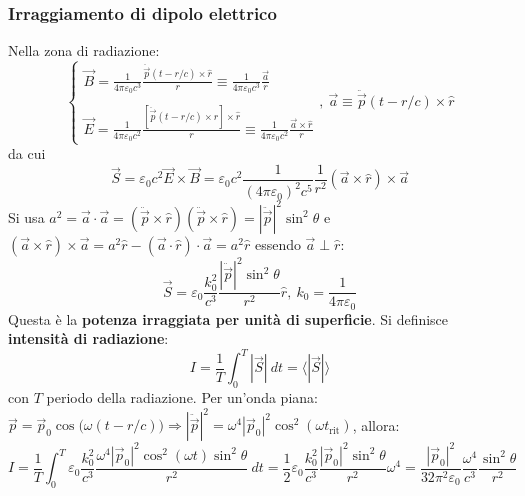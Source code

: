 \documentclass[a4paper]{scrartcl}
\numberwithin{equation}{subsection}
\theoremstyle{style1}
\begin{document}
\subsubsection{Irraggiamento di dipolo elettrico}\label{ide}

Nella zona di radiazione:
\[
\begin{cases}
	\displaystyle \vec{B} = \frac{1}{4\pi \varepsilon _0 c^3}\frac{\ddot{\vec{p}}(t - r /c)\times \hat{r}}{r}\equiv \frac{1}{4\pi \varepsilon _0 c^3}\frac{\vec{a}}{r}\\
	\\
	\displaystyle \vec{E}= \frac{1}{4\pi \varepsilon _0 c^2} \frac{\left[ \ddot{\vec{p}}(t- r / c) \times \hat{r} \right] \times \hat{r}}{r}\equiv \frac{1}{4\pi \varepsilon _0 c^2} \frac{\vec{a}\times \hat{r}}{r}
\end{cases}, \ \vec{a}\equiv \ddot{\vec{p}}(t - r /c) \times \hat{r}
\] 
da cui
\begin{equation*}
	\vec{S}=\varepsilon _0 c^2 \vec{E}\times \vec{B}=\varepsilon _0 c^2 \frac{1}{(4 \pi \varepsilon _0)^2 c^5} \frac{1}{r^2} (\vec{a}\times \hat{r}) \times \vec{a}
\end{equation*}
Si usa $a^2 = \vec{a}\cdot \vec{a}=(\ddot{\vec{p}}\times \hat{r}) (\ddot{\vec{p}}\times \hat{r}) = |\ddot{\vec{p}}|^2 \sin^2 \theta $ e $(\vec{a}\times \hat{r})\times \vec{a}= a^2 \hat{r}- (\vec{a}\cdot \hat{r}) \cdot \vec{a}= a^2 \hat{r}$ essendo $\vec{a}\perp \hat{r}$:
\begin{equation}
	\vec{S}= \varepsilon _0 \frac{k_0^2}{c^3} \frac{|\ddot{\vec{p}}|^2 \sin^2 \theta }{r^2} \hat{r}, \ k_0 = \frac{1}{4\pi \varepsilon _0}
\end{equation}
Questa \`e la \textbf{potenza irraggiata per unit\`a di superficie}. Si definisce \textbf{intensit\`a di radiazione}:
\begin{equation}
	I = \frac{1}{T} \int_{0} ^T |\vec{S}| \ dt = \langle |\vec{S}| \rangle
\end{equation}
con $T$ periodo della radiazione. Per un'onda piana: $\vec{p}=\vec{p}_0 \cos\big(\omega(t - r /c)\big) \Rightarrow |\ddot{\vec{p}}|^2 = \omega^4 \left\lvert \vec{p}_0 \right\rvert ^2 \cos^2 (\omega t_\text{rit})$, allora:
\begin{equation*}
	I = \frac{1}{T}\int_{0} ^T \varepsilon _0 \frac{k_0^2}{c^3} \frac{\omega^4 \left\lvert \vec{p}_0 \right\rvert ^2 \cos^2 (\omega t) \sin^2 \theta }{r^2} \ dt = \frac{1}{2}\varepsilon _0 \frac{k_0^2}{c^3}\frac{\left\lvert \vec{p}_0 \right\rvert ^2 \sin ^2 \theta }{ r^2}\omega^4  = \frac{\left\lvert \vec{p}_0 \right\rvert ^2}{32 \pi^2 \varepsilon _0} \frac{\omega^4}{c^3}\frac{\sin^2 \theta }{r^2}
\end{equation*}
\end{document}
